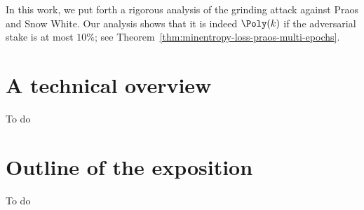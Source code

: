 In this work, we put forth a rigorous analysis of the grinding attack against Praos and Snow White. 
Our analysis shows that it is indeed $\Poly(k)$ if the adversarial stake is at most $10\%$; 
see Theorem~\ref{thm:minentropy-loss-praos-multi-epochs}.







\section{A technical overview}
To do


\section{Outline of the exposition}
To do
